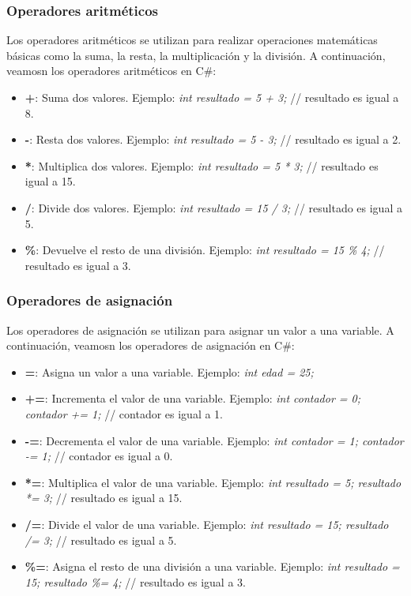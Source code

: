 \documentclass[executivepaper]{article}
\begin{document}
\subsubsection*{Operadores aritméticos}

Los operadores aritméticos se utilizan para realizar operaciones matemáticas básicas como la suma, la resta, la multiplicación y la división. A continuación, veamosn los operadores aritméticos en C\#:

\begin{itemize}
    \item \textbf{+}: Suma dos valores. Ejemplo: \emph{int resultado = 5 + 3;} // resultado es igual a 8.
    \item \textbf{-}: Resta dos valores. Ejemplo: \emph{int resultado = 5 - 3;} // resultado es igual a 2.
    \item \textbf{*}: Multiplica dos valores. Ejemplo: \emph{int resultado = 5 * 3;} // resultado es igual a 15.
    \item \textbf{/}: Divide dos valores. Ejemplo: \emph{int resultado = 15 / 3;} // resultado es igual a 5.
    \item \textbf{\%}: Devuelve el resto de una división. Ejemplo: \emph{int resultado = 15 \% 4;} // resultado es igual a 3.
\end{itemize}

\subsubsection*{Operadores de asignación}

Los operadores de asignación se utilizan para asignar un valor a una variable. A continuación, veamosn los operadores de asignación en C\#:

\begin{itemize}
    \item \textbf{=}: Asigna un valor a una variable. Ejemplo: \emph{int edad = 25;}
    \item \textbf{+=}: Incrementa el valor de una variable. Ejemplo: \emph{int contador = 0; contador += 1;} // contador es igual a 1.
    \item \textbf{-=}: Decrementa el valor de una variable. Ejemplo: \emph{int contador = 1; contador -= 1;} // contador es igual a 0.
    \item \textbf{*=}: Multiplica el valor de una variable. Ejemplo: \emph{int resultado = 5; resultado *= 3;} // resultado es igual a 15.
    \item \textbf{/=}: Divide el valor de una variable. Ejemplo: \emph{int resultado = 15; resultado /= 3;} // resultado es igual a 5.
    \item \textbf{\%=}: Asigna el resto de una división a una variable. Ejemplo: \emph{int resultado = 15; resultado \%= 4;} // resultado es igual a 3.
    \end{itemize}
\end{document}
